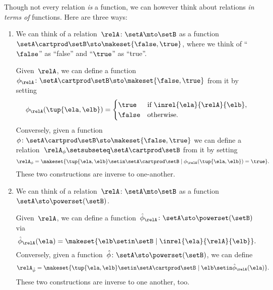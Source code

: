 \label{rem:rel-three-fun-descriptions}
Though not every relation \emph{is} a function, we can however think about relations \emph{in terms of} functions.
Here are three ways:
\begin{enumerate}
    \item We can think of a relation~$\relA \colon \setA \mto\setB$ as a function~$\setA \cartprod \setB \sto \makeset{ \false, \true }$, where we think of ``$\false$'' as ``false'' and ``$\true$'' as ``true''.

          Given~$\relA$, we can define a function~$\phi_{\relA} \colon \setA \cartprod \setB \sto \makeset{ \false, \true }$ from it by setting
          \begin{equation}
              \phi_{\relA}(\tup{\ela, \elb}) =
              \begin{cases}
                  \true  & \text{if } \inrel{\ela}{\relA}{\elb}, \\
                  \false & \text{otherwise}.
              \end{cases}
          \end{equation}
          Conversely, given a function~$\phi\colon \setA \cartprod \setB \sto \makeset{ \false, \true }$ we can define a relation~$\relA_{\phi} \setsubseteq \setA \cartprod \setB$ from it by setting
          \begin{equation}
              \relA_{\phi} = \makeset{ \tup{\ela, \elb} \setin \setA \cartprod \setB \mid \phi_{\relA}(\tup{\ela, \elb}) = \true }.
          \end{equation}
          These two constructions are inverse to one-another.

    \item We can think of a relation~$\relA \colon \setA \mto \setB$ as a function~$\setA  \sto \powerset (\setB)$.

          Given~$\relA$, we can define a function~$\hat \phi_{\relA} \colon \setA \sto \powerset (\setB)$ via
          \begin{equation}
              \hat \phi_{\relA} (\ela) = \makeset{ \elb \setin \setB \mid \inrel{\ela}{\relA}{\elb}}.
          \end{equation}
          Conversely, given a function~$\hat \phi \colon \setA \sto \powerset (\setB)$, we can define
          \begin{equation}
              \relA_{\hat \phi} = \makeset{ \tup{\ela, \elb} \setin \setA \cartprod \setB \mid \elb \setin \hat \phi_{\relA}(\ela)   }.
          \end{equation}
          These two constructions are inverse to one another, too.


\end{enumerate}
